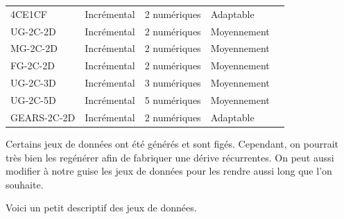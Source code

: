 \documentclass[11pt,a4paper]{report}
\begin{document}
\begin{tabular}{ |p{3cm}||p{3cm}|p{3cm}|p{3cm}|p{3cm}|  }
4CE1CF & Incrémental& 2 numériques & Adaptable  &  \\
UG-2C-2D & Incrémental& 2 numériques& Moyennement  &  \\
MG-2C-2D & Incrémental& 2 numériques& Moyennement  & \\
FG-2C-2D & Incrémental& 2 numériques& Moyennement  & \\
UG-2C-3D & Incrémental& 3 numériques& Moyennement  &  \\
UG-2C-5D & Incrémental& 5 numériques & Moyennement  & \\
GEARS-2C-2D & Incrémental & 2 numériques& Adaptable  & \\
 \hline
\end{tabular}




Certains jeux de données ont été générés et sont figés. Cependant, on pourrait très bien les regénérer afin de fabriquer une dérive récurrentes. On peut aussi modifier à notre guise les jeux de données pour les rendre aussi long que l'on souhaite.

Voici un petit descriptif des jeux de données.
\end{document}
